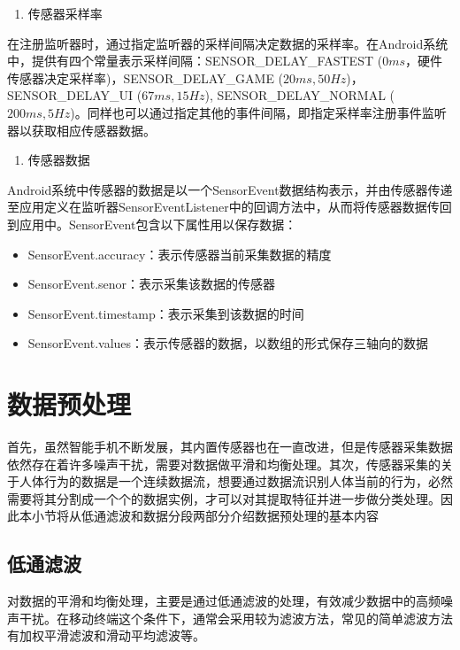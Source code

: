 \begin{enumerate}[(2)]
	\item 传感器采样率
\end{enumerate}
\par 在注册监听器时，通过指定监听器的采样间隔决定数据的采样率。在Android系统中，提供有四个常量表示采样间隔：SENSOR\_DELAY\_FASTEST ($0ms$，硬件传感器决定采样率)，SENSOR\_DELAY\_GAME ($20ms, 50Hz$)，SENSOR\_DELAY\_UI ($67ms, 15Hz$), SENSOR\_DELAY\_NORMAL ($200ms, 5Hz$)。同样也可以通过指定其他的事件间隔，即指定采样率注册事件监听器以获取相应传感器数据。

\begin{enumerate}[(3)]
	\item 传感器数据
\end{enumerate}
\par Android系统中传感器的数据是以一个SensorEvent数据结构表示，并由传感器传递至应用定义在监听器SensorEventListener中的回调方法中，从而将传感器数据传回到应用中。SensorEvent包含以下属性用以保存数据：
\begin{itemize}
	\item SensorEvent.accuracy：表示传感器当前采集数据的精度
	\item SensorEvent.senor：表示采集该数据的传感器
	\item SensorEvent.timestamp：表示采集到该数据的时间
	\item SensorEvent.values：表示传感器的数据，以数组的形式保存三轴向的数据
\end{itemize}

\section{数据预处理}
\par 首先，虽然智能手机不断发展，其内置传感器也在一直改进，但是传感器采集数据依然存在着许多噪声干扰，需要对数据做平滑和均衡处理。其次，传感器采集的关于人体行为的数据是一个连续数据流，想要通过数据流识别人体当前的行为，必然需要将其分割成一个个的数据实例，才可以对其提取特征并进一步做分类处理。因此本小节将从低通滤波和数据分段两部分介绍数据预处理的基本内容

\subsection{低通滤波}
\par 对数据的平滑和均衡处理，主要是通过低通滤波的处理，有效减少数据中的高频噪声干扰。在移动终端这个条件下，通常会采用较为滤波方法，常见的简单滤波方法有加权平滑滤波和滑动平均滤波等。

